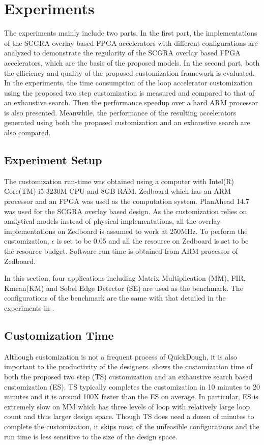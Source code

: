 \section{Experiments}
The experiments mainly include two parts. In the first part, the implementations of the SCGRA overlay based FPGA accelerators with different configurations are analyzed to demonstrate the regularity of the SCGRA overlay based FPGA accelerators, which are the basis of the proposed models. In the second part, both the efficiency and quality of the proposed customization framework is evaluated. In the experiments, the time consumption of the loop accelerator customization using the proposed two step customization is measured and compared to that of an exhaustive search. Then the performance speedup over a hard ARM processor is also presented. Meanwhile, the performance of the resulting accelerators generated using both the proposed customization and an exhaustive search are also compared. 

\subsection{Experiment Setup}
The customization run-time was obtained using a computer with Intel(R) Core(TM) i5-3230M CPU and 8GB RAM. Zedboard which has an ARM processor and an FPGA was used as the computation system. PlanAhead 14.7 was used for the SCGRA overlay based design. As the customization relies on analytical models instead of physical implementations, all the overlay implementations on Zedboard is assumed to work at 250MHz. To perform the customization, $\epsilon$ is set to be 0.05 and all the resource on Zedboard is set to be the resource budget. Software run-time is obtained from ARM processor of Zedboard.

In this section, four applications including Matrix Multiplication (MM), FIR, Kmean(KM) and Sobel Edge Detector (SE) are used as the benchmark. The configurations of the benchmark are the same with that detailed in the experiments in . 

\subsection{Customization Time}
Although customization is not a frequent process of QuickDough, it is also important to the productivity of the designers.  shows the customization time of both the proposed two step (TS) customization and an exhaustive search based customization (ES). TS typically completes the customization in 10 minutes to 20 minutes and it is around 100X faster than the ES on average. In particular, ES is extremely slow on MM which has three levels of loop with relatively large loop count and thus larger design space. Though TS does need a dozen of minutes to complete the customization, it skips most of the unfeasible configurations and the run time is less sensitive to the size of the design space. 


